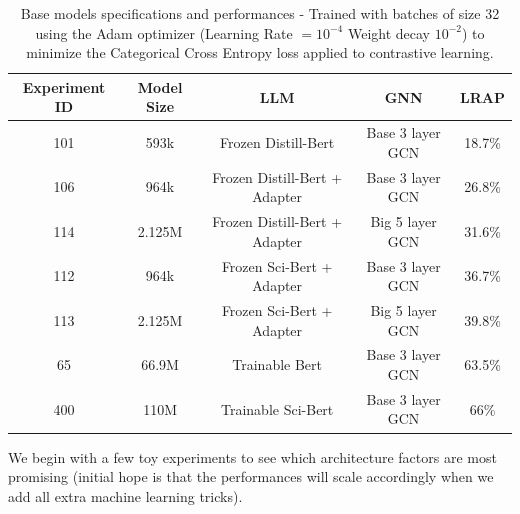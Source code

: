 \begin{table}[h]
    \centering
    \begin{tabular}{|c|c|c|c|c|}
    \hline
    \textbf{Experiment ID} & \textbf{Model Size} & \textbf{LLM} & \textbf{GNN} & \textbf{LRAP} \\ \hline
    101         & 593k                & Frozen Distill-Bert           & Base 3 layer GCN       & 18.7\%      \\ \hline
    106         & 964k                & Frozen Distill-Bert + Adapter & Base 3 layer GCN       & 26.8\%      \\ \hline
    114         & 2.125M              & Frozen Distill-Bert + Adapter & Big 5 layer GCN        & 31.6\%      \\ \hline
    112         & 964k                & Frozen Sci-Bert + Adapter     & Base 3 layer GCN       & 36.7\%      \\ \hline
    113         & 2.125M              & Frozen Sci-Bert + Adapter     & Big 5 layer GCN        & 39.8\%      \\ \hline
    65          & 66.9M               & Trainable Bert                & Base 3 layer GCN       & 63.5\%      \\ \hline
    400         & 110M                & Trainable Sci-Bert            & Base 3 layer GCN       & 66\%        \\ \hline
    \end{tabular}
    \caption{Base models specifications and performances - Trained with batches of size 32 using the Adam optimizer \cite{adamKingma} (Learning Rate $=10^{-4}$ Weight decay $10^{-2}$) to minimize the Categorical Cross Entropy loss applied to contrastive learning.}
    \label{tab:preliminary_study_metrics}
\end{table}


We begin with a few toy experiments to see which architecture factors are most promising (initial hope is that the performances will scale accordingly when we add all extra machine learning tricks).

